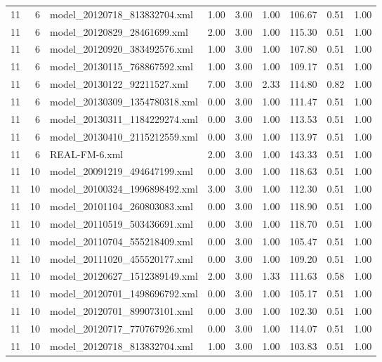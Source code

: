 \begin{table}[ht]
\begin{tabular}{rrlrrrrrr}
   11 &   6 & model\_20120718\_813832704.xml & 1.00 & 3.00 & 1.00 & 106.67 & 0.51 & 1.00 \\ 
   11 &   6 & model\_20120829\_28461699.xml & 2.00 & 3.00 & 1.00 & 115.30 & 0.51 & 1.00 \\ 
   11 &   6 & model\_20120920\_383492576.xml & 1.00 & 3.00 & 1.00 & 107.80 & 0.51 & 1.00 \\ 
   11 &   6 & model\_20130115\_768867592.xml & 1.00 & 3.00 & 1.00 & 109.17 & 0.51 & 1.00 \\ 
   11 &   6 & model\_20130122\_92211527.xml & 7.00 & 3.00 & 2.33 & 114.80 & 0.82 & 1.00 \\ 
   11 &   6 & model\_20130309\_1354780318.xml & 0.00 & 3.00 & 1.00 & 111.47 & 0.51 & 1.00 \\ 
   11 &   6 & model\_20130311\_1184229274.xml & 0.00 & 3.00 & 1.00 & 113.53 & 0.51 & 1.00 \\ 
   11 &   6 & model\_20130410\_2115212559.xml & 0.00 & 3.00 & 1.00 & 113.97 & 0.51 & 1.00 \\ 
   11 &   6 & REAL-FM-6.xml & 2.00 & 3.00 & 1.00 & 143.33 & 0.51 & 1.00 \\ 
   11 &  10 & model\_20091219\_494647199.xml & 0.00 & 3.00 & 1.00 & 118.63 & 0.51 & 1.00 \\ 
   11 &  10 & model\_20100324\_1996898492.xml & 3.00 & 3.00 & 1.00 & 112.30 & 0.51 & 1.00 \\ 
   11 &  10 & model\_20101104\_260803083.xml & 0.00 & 3.00 & 1.00 & 118.90 & 0.51 & 1.00 \\ 
   11 &  10 & model\_20110519\_503436691.xml & 0.00 & 3.00 & 1.00 & 118.70 & 0.51 & 1.00 \\ 
   11 &  10 & model\_20110704\_555218409.xml & 0.00 & 3.00 & 1.00 & 105.47 & 0.51 & 1.00 \\ 
   11 &  10 & model\_20111020\_455520177.xml & 0.00 & 3.00 & 1.00 & 109.20 & 0.51 & 1.00 \\ 
   11 &  10 & model\_20120627\_1512389149.xml & 2.00 & 3.00 & 1.33 & 111.63 & 0.58 & 1.00 \\ 
   11 &  10 & model\_20120701\_1498696792.xml & 0.00 & 3.00 & 1.00 & 105.17 & 0.51 & 1.00 \\ 
   11 &  10 & model\_20120701\_899073101.xml & 0.00 & 3.00 & 1.00 & 102.30 & 0.51 & 1.00 \\ 
   11 &  10 & model\_20120717\_770767926.xml & 0.00 & 3.00 & 1.00 & 114.07 & 0.51 & 1.00 \\ 
   11 &  10 & model\_20120718\_813832704.xml & 1.00 & 3.00 & 1.00 & 103.83 & 0.51 & 1.00 \\ 

\end{tabular}
\end{table}
